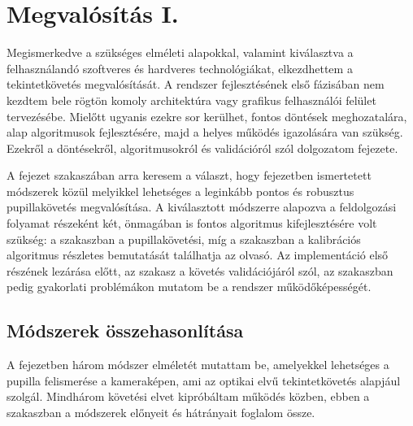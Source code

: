 \chapter{Megvalósítás I.}\label{sect:megvalositas_1}

Megismerkedve a szükséges elméleti alapokkal, valamint kiválasztva a felhasználandó szoftveres és hardveres technológiákat, elkezdhettem a tekintetkövetés megvalósítását. A rendszer fejlesztésének első fázisában nem kezdtem bele rögtön komoly architektúra vagy grafikus felhasználói felület tervezésébe. Mielőtt ugyanis ezekre sor kerülhet, fontos döntések meghozatalára, alap algoritmusok fejlesztésére, majd a helyes működés igazolására van szükség. Ezekről a döntésekről, algoritmusokról és validációról szól dolgozatom  fejezete.

\bigskip

A fejezet  szakaszában arra keresem a választ, hogy  fejezetben ismertetett módszerek közül melyikkel lehetséges a leginkább pontos és robusztus pupillakövetés megvalósítása. A kiválasztott módszerre alapozva a feldolgozási folyamat részeként két, önmagában is fontos algoritmus kifejlesztésére volt szükség: a  szakaszban a pupillakövetési, míg  a  szakaszban a kalibrációs algoritmus részletes bemutatását találhatja az olvasó. Az implementáció első részének lezárása előtt, az  szakasz a követés validációjáról szól, az  szakaszban pedig gyakorlati problémákon mutatom be a rendszer működőképességét.

\section{Módszerek összehasonlítása}\label{sect:modsz_osszehasonlitas}

A  fejezetben három módszer elméletét mutattam be, amelyekkel lehetséges a pupilla felismerése a kameraképen, ami az optikai elvű tekintetkövetés alapjául szolgál. Mindhárom követési elvet kipróbáltam működés közben, ebben a szakaszban a módszerek előnyeit és hátrányait foglalom össze.

